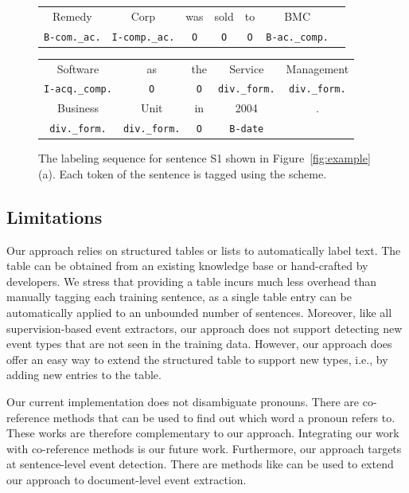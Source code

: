 \begin{figure}[t!]
\centering
\scriptsize
\begin{tabular}{ccccccc}
\toprule
Remedy & Corp & was & sold & to & BMC & \\
\rowcolor{Gray} \texttt{B-com.\_ac.} & \texttt{I-comp.\_ac.} & \texttt{O} & \texttt{O} & \texttt{O} & \texttt{B-ac.\_comp.} &\\
\end{tabular}
\begin{tabular}{ccccc}
Software & as & the & Service &Management \\
\rowcolor{Gray} \texttt{I-acq.\_comp.} & \texttt{O} & \texttt{O} & \texttt{div.\_form.} & \texttt{div.\_form.} \\
Business & Unit & in & 2004 &.\\
\rowcolor{Gray} \texttt{div.\_form.} & \texttt{div.\_form.} & \texttt{O} & \texttt{B-date} &\\
\bottomrule
\end{tabular}

\caption{The labeling sequence for sentence S1 shown in Figure~\ref{fig:example} (a). Each token of the sentence is tagged using the \BIO
scheme. \label{fig:ls}}
\end{figure}

\subsection{Limitations}
Our approach relies on structured tables or lists to automatically label text. The table can be obtained from an existing knowledge base or
hand-crafted by developers. We stress that providing a table incurs much less overhead than manually tagging each training sentence, as a
single table entry can be automatically applied to an unbounded number of sentences.  Moreover, like all supervision-based event
extractors, our approach does not support detecting new event types that are not seen in the training data. However, our approach does
offer an easy way to extend the structured table to support new types, i.e., by adding new entries to the table.


Our current implementation does not disambiguate pronouns. There are co-reference methods\FIXME{~\cite{}} that can be used to find out
which word a pronoun refers to. These works are therefore complementary to our approach. Integrating our work with co-reference methods is
our future work. Furthermore, our approach targets at sentence-level event detection. There are methods like \FIXME{\cite{}} can be used to
extend our approach to document-level event extraction.
